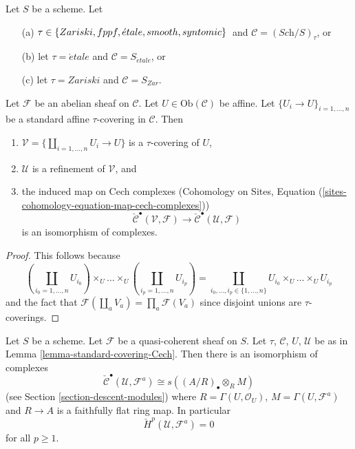 \begin{lemma}
\label{lemma-standard-covering-Cech}
Let $S$ be a scheme. Let
\begin{enumerate}
\item[(a)] $\tau \in \{Zariski,\linebreak[0] fppf,\linebreak[0]
\acute{e}tale,\linebreak[0] smooth,\linebreak[0] syntomic\}$\
and $\mathcal{C} = (\textit{Sch}/S)_\tau$, or
\item[(b)] let $\tau = \acute{e}tale$ and $\mathcal{C} = S_{\acute{e}tale}$, or
\item[(c)] let $\tau = Zariski$ and $\mathcal{C} = S_{Zar}$.
\end{enumerate}
Let $\mathcal{F}$ be an abelian sheaf on $\mathcal{C}$.
Let $U \in \text{Ob}(\mathcal{C})$ be affine.
Let $\{U_i \to U\}_{i = 1, \ldots, n}$ be a standard affine
$\tau$-covering in $\mathcal{C}$. Then
\begin{enumerate}
\item $\mathcal{V} = \{\coprod_{i = 1, \ldots, n} U_i \to U\}$ is a
$\tau$-covering of $U$,
\item $\mathcal{U}$ is a refinement of $\mathcal{V}$, and
\item the induced map on Cech complexes
(Cohomology on Sites,
Equation (\ref{sites-cohomology-equation-map-cech-complexes}))
$$
\check{\mathcal{C}}^\bullet(\mathcal{V}, \mathcal{F})
\longrightarrow
\check{\mathcal{C}}^\bullet(\mathcal{U}, \mathcal{F})
$$
is an isomorphism of complexes.
\end{enumerate}
\end{lemma}

\begin{proof}
This follows because
$$
\textstyle(\coprod_{i_0 = 1, \ldots, n} U_{i_0}) \times_U
\ldots \times_U
(\coprod_{i_p = 1, \ldots, n} U_{i_p})
=
\coprod_{i_0, \ldots, i_p \in \{1, \ldots, n\}}
U_{i_0} \times_U \ldots \times_U U_{i_p}
$$
and the fact that $\mathcal{F}(\coprod_a V_a) = \prod_a \mathcal{F}(V_a)$
since disjoint unions are $\tau$-coverings.
\end{proof}

\begin{lemma}
\label{lemma-standard-covering-Cech-quasi-coherent}
Let $S$ be a scheme. Let $\mathcal{F}$ be a quasi-coherent sheaf on $S$.
Let $\tau$, $\mathcal{C}$, $U$, $\mathcal{U}$ be as in
Lemma \ref{lemma-standard-covering-Cech}. Then there is an isomorphism
of complexes
$$
\check{\mathcal{C}}^\bullet(\mathcal{U}, \mathcal{F}^a)
\cong
s((A/R)_\bullet \otimes_R M)
$$
(see Section \ref{section-descent-modules})
where $R = \Gamma(U, \mathcal{O}_U)$, $M = \Gamma(U, \mathcal{F}^a)$
and $R \to A$ is a faithfully flat ring map. In particular
$$
\check{H}^p(\mathcal{U}, \mathcal{F}^a) = 0
$$
for all $p \geq 1$.
\end{lemma}

